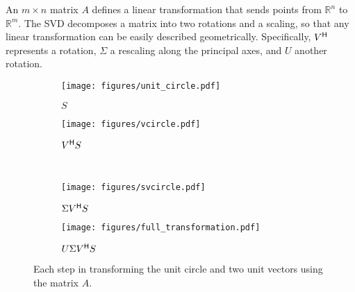 An $m\times n$ matrix $A$ defines a linear transformation that sends points from $\mathbb{R}^n$ to $\mathbb{R}^m$.
The SVD decomposes a matrix into two rotations and a scaling, so that any linear transformation can be easily described geometrically.
Specifically, $V^{\mathsf H}$ represents a rotation, $\Sigma$ a rescaling along the principal axes, and $U$ another rotation.

\begin{figure}
\centering
\begin{subfigure}{.35\textwidth}
  \centering
  \texttt{[image: figures/unit\_circle.pdf]}
  \caption{$S$}
\end{subfigure}
\quad
\begin{subfigure}{.35\textwidth}
  \centering
  \texttt{[image: figures/vcircle.pdf]}
  \caption{$V^{\mathsf H} S$}
\end{subfigure}
\\
\begin{subfigure}{.35\textwidth}
  \centering
  \texttt{[image: figures/svcircle.pdf]}
  \caption{$\Sigma V^{\mathsf H} S$}
\end{subfigure}
\quad
\begin{subfigure}{.35\textwidth}
  \centering
  \texttt{[image: figures/full\_transformation.pdf]}
  \caption{$U \Sigma V^{\mathsf H} S$}
\end{subfigure}
\caption{Each step in transforming the unit circle and two unit vectors using the matrix $A$.}
\label{fig:svd-visualization}
\end{figure}

